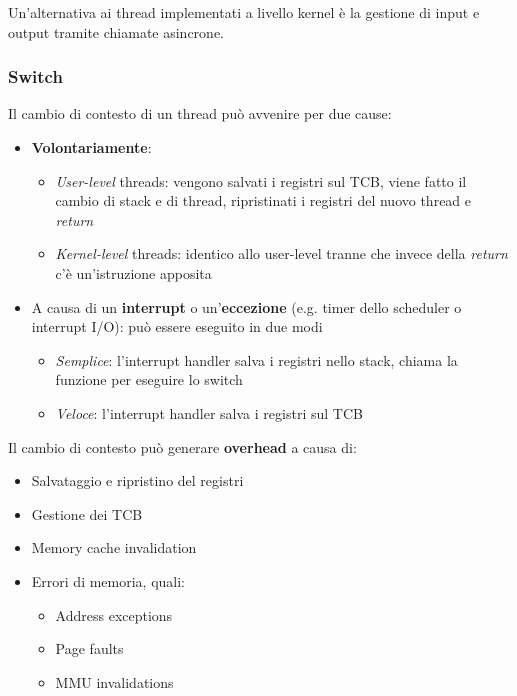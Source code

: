 \begin{observation}[Asynchronous I/O]
	Un'alternativa ai thread implementati a livello kernel è la gestione di input e output tramite chiamate asincrone.
\end{observation}

\subsubsection{Switch}
Il cambio di contesto di un thread può avvenire per due cause:
\begin{itemize}
	\item \textbf{Volontariamente}:
	\begin{itemize}
		\item \textit{User-level} threads: vengono salvati i registri sul TCB, viene fatto il cambio di stack e  di thread, ripristinati i registri del nuovo thread e \textit{return}
		\item \textit{Kernel-level} threads: identico allo user-level tranne che invece della \textit{return} c'è un'istruzione apposita
	\end{itemize}
	\item A causa di un \textbf{interrupt} o un'\textbf{eccezione} (e.g. timer dello scheduler o interrupt I/O): può essere eseguito in due modi
	\begin{itemize}
		\item \textit{Semplice}: l'interrupt handler salva i registri nello stack, chiama la funzione per eseguire lo switch 
		\item \textit{Veloce}: l'interrupt handler salva i registri sul TCB
	\end{itemize}
\end{itemize}
Il cambio di contesto può generare \textbf{overhead} a causa di:
\begin{itemize}
	\item Salvataggio e ripristino del registri
	\item Gestione dei TCB
	\item Memory cache invalidation
	\item Errori di memoria, quali:
	\begin{itemize}
		\item Address exceptions
		\item Page faults
		\item MMU invalidations
	\end{itemize}
\end{itemize}
